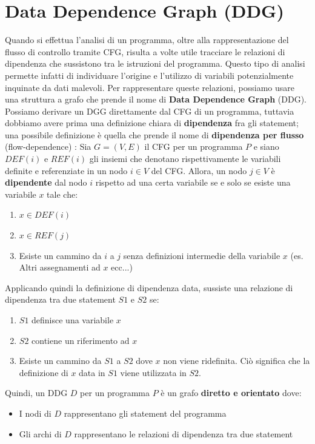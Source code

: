 \documentclass[../main.tex]{subfiles}
\begin{document}
\section{Data Dependence Graph (DDG)}
Quando si effettua l'analisi di un programma, oltre alla rappresentazione del flusso di controllo tramite CFG, risulta a volte utile tracciare le relazioni di dipendenza che sussistono tra le istruzioni del programma.
Questo tipo di analisi permette infatti di individuare l'origine e l'utilizzo di variabili potenzialmente inquinate da dati malevoli. Per rappresentare queste relazioni, possiamo usare una struttura a grafo che prende il nome
di \textbf{Data Dependence Graph} (DDG). Possiamo derivare un DGG direttamente dal CFG di un programma, tuttavia dobbiamo avere prima una definizione chiara di \textbf{dipendenza} fra gli statement; una possibile definizione è quella che prende il nome di \textbf{dipendenza per flusso} (flow-dependence) \cite{DDG}:
Sia $G = (V, E)$ il CFG per un programma $P$ e siano $DEF(i)$ e $REF(i)$ gli insiemi che denotano rispettivamente le variabili definite e referenziate in un nodo $i \in V$ del CFG.
Allora, un nodo $j \in V$ è \textbf{dipendente} dal nodo $i$ rispetto ad una certa variabile se e solo se esiste una variabile $x$ tale che:
\begin{enumerate}
    \item $x \in DEF(i)$
    \item $x \in REF(j)$
    \item Esiste un cammino da $i$ a $j$ senza definizioni intermedie della variabile $x$ (es. Altri assegnamenti ad $x$ ecc...)
\end{enumerate} 
Applicando quindi la definizione di dipendenza data, sussiste una relazione di dipendenza tra due statement $S1$ e $S2$ se:
\begin{enumerate}
    \item $S1$ definisce una variabile $x$
    \item $S2$ contiene un riferimento ad $x$
    \item Esiste un cammino da $S1$ a $S2$ dove $x$ non viene ridefinita. Ciò significa che la definizione di $x$ data in $S1$ viene utilizzata in $S2$.  
\end{enumerate}
Quindi, un DDG $D$ per un programma $P$ è un grafo \textbf{diretto e orientato} dove:
\begin{itemize}
    \item I nodi di $D$ rappresentano gli statement del programma
    \item Gli archi di $D$ rappresentano le relazioni di dipendenza tra due statement
\end{itemize}
\end{document}
